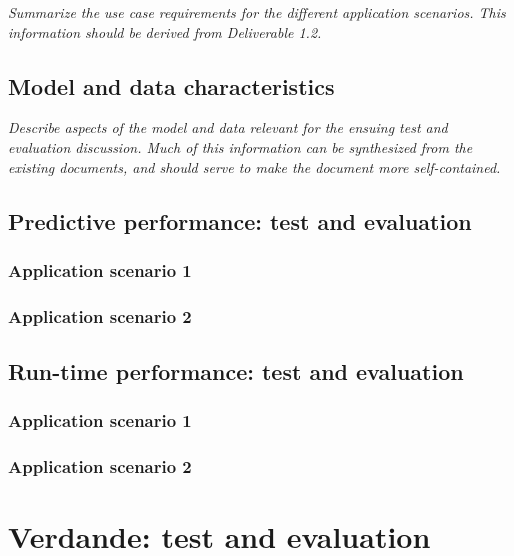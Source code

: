 \documentclass[11pt, oneside]{article}   	%
\numberwithin{figure}{section}
\numberwithin{equation}{section}
\numberwithin{table}{section}
\begin{document}
\emph{Summarize the use case requirements for the different application scenarios. This information should be
  derived from Deliverable 1.2.}

\subsection{Model and data characteristics}

\emph{Describe aspects of the model and data relevant for the ensuing test and evaluation discussion. Much of
  this information can be synthesized from the existing documents, and should serve to make the document more
  self-contained. }




\subsection{Predictive performance: test and evaluation}

\subsubsection{Application scenario 1}

\subsubsection{Application scenario 2}

\subsection{Run-time performance: test and evaluation}

\subsubsection{Application scenario 1}

\subsubsection{Application scenario 2}



\section{Verdande: test and evaluation}
\end{document}
